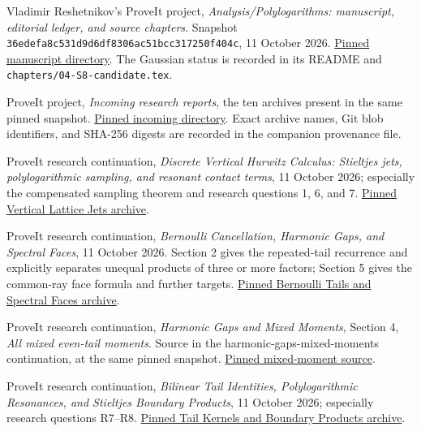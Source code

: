 Vladimir Reshetnikov's ProveIt project,
\emph{Analysis/Polylogarithms: manuscript, editorial ledger, and source chapters}.
Snapshot \texttt{36edefa8c531d9d6df8306ac51bcc317250f404c},
11 October 2026.
\href{https://github.com/VladimirReshetnikov/ProveIt/tree/36edefa8c531d9d6df8306ac51bcc317250f404c/Analysis/Polylogarithms/docs/manuscript}{Pinned manuscript directory}.
The Gaussian status is recorded in its README and
\texttt{chapters/04-S8-candidate.tex}.

ProveIt project, \emph{Incoming research reports},
the ten archives present in the same pinned snapshot.
\href{https://github.com/VladimirReshetnikov/ProveIt/tree/36edefa8c531d9d6df8306ac51bcc317250f404c/docs/incoming}{Pinned incoming directory}.
Exact archive names, Git blob identifiers, and SHA-256 digests are
recorded in the companion provenance file.

ProveIt research continuation,
\emph{Discrete Vertical Hurwitz Calculus:
Stieltjes jets, polylogarithmic sampling, and resonant contact terms},
11 October 2026; especially the compensated sampling theorem and
research questions 1, 6, and 7.
\href{https://github.com/VladimirReshetnikov/ProveIt/blob/36edefa8c531d9d6df8306ac51bcc317250f404c/docs/incoming/ProveIt_Vertical_Lattice_Jets_2026-10-11.zip}{Pinned Vertical Lattice Jets archive}.

ProveIt research continuation,
\emph{Bernoulli Cancellation, Harmonic Gaps, and Spectral Faces},
11 October 2026. Section 2 gives the repeated-tail recurrence and
explicitly separates unequal products of three or more factors;
Section 5 gives the common-ray face formula and further targets.
\href{https://github.com/VladimirReshetnikov/ProveIt/blob/36edefa8c531d9d6df8306ac51bcc317250f404c/docs/incoming/ProveIt_Bernoulli_Tails_and_Spectral_Faces_2026-10-11.zip}{Pinned Bernoulli Tails and Spectral Faces archive}.

ProveIt research continuation,
\emph{Harmonic Gaps and Mixed Moments}, Section 4,
\emph{All mixed even-tail moments}.
Source in the harmonic-gaps-mixed-moments continuation,
at the same pinned snapshot.
\href{https://github.com/VladimirReshetnikov/ProveIt/blob/36edefa8c531d9d6df8306ac51bcc317250f404c/Analysis/Polylogarithms/docs/reports/stieltjes-harmonic-resonance/continuations/harmonic-gaps-mixed-moments/sections/04_mixed_moments.tex}{Pinned mixed-moment source}.

ProveIt research continuation,
\emph{Bilinear Tail Identities, Polylogarithmic Resonances,
and Stieltjes Boundary Products},
11 October 2026; especially research questions R7--R8.
\href{https://github.com/VladimirReshetnikov/ProveIt/blob/36edefa8c531d9d6df8306ac51bcc317250f404c/docs/incoming/ProveIt_Tail_Kernels_and_Boundary_Products_2026-10-11.zip}{Pinned Tail Kernels and Boundary Products archive}.

